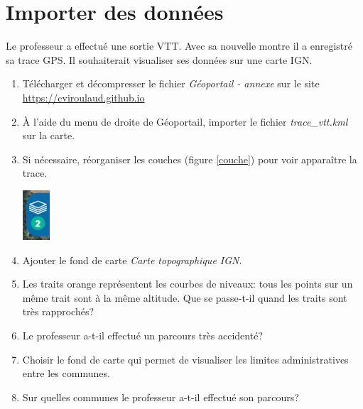 \documentclass[a4paper,11pt]{article}
\begin{document}
\section{Importer des données}
Le professeur a effectué une sortie VTT. Avec sa nouvelle montre il a enregistré sa trace GPS. Il souhaiterait visualiser ses données sur une carte IGN.
\begin{activite}
\begin{enumerate}
    \item Télécharger et décompresser le fichier \emph{Géoportail - annexe} sur le site \url{https://cviroulaud.github.io}
    \item À l'aide du menu de droite de Géoportail, importer le fichier \emph{trace\_vtt.kml} sur la carte.
    \item Si nécessaire, réorganiser les couches (figure \ref{couche}) pour voir apparaître la trace.
    \begin{center}
    \centering
    \includegraphics[width=1cm]{ressources/droite-2.png}
    \label{couche}
    \end{center}
    \item Ajouter le fond de carte \emph{Carte topographique IGN}.
    \item Les traits orange représentent les courbes de niveaux: tous les points sur un même trait sont à la même altitude. Que se passe-t-il quand les traits sont très rapprochés?
    \item Le professeur a-t-il effectué un parcours très accidenté?
    \item Choisir le fond de carte qui permet de visualiser les limites administratives entre les communes.
    \item Sur quelles communes le professeur a-t-il effectué son parcours?
\end{enumerate}
\end{activite}
\end{document}
